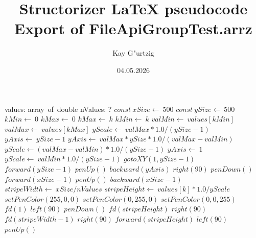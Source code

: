 \documentclass[a4paper,10pt]{article}
\title{Structorizer LaTeX pseudocode Export of FileApiGroupTest.arrz}
\author{Kay G"urtzig}
\date{04.05.2026}
\begin{document}
\begin{algorithm}
\caption{drawBarChart(2)}
\begin{algorithmic}[5]
\State {}
\State {}
\State {}
\State {}
    \State values: array\ of\ double
    \State nValues: ?
  \EndDecl
  \State \(const\ xSize\gets\ 500\)
  \State \(const\ ySize\gets\ 500\)
  \State \(kMin\gets\ 0\)
  \State \(kMax\gets\ 0\)
      \State \(kMax\gets\ k\)
    \Else
        \State \(kMin\gets\ k\)
      \EndIf
    \EndIf
  \EndFor
  \State \(valMin\gets\ values[kMin]\)
  \State \(valMax\gets\ values[kMax]\)
  \State \(yScale\gets\ valMax*1.0/(ySize-1)\)
  \State \(yAxis\gets\ ySize-1\)
      \State \(yAxis\gets\ valMax*ySize*1.0/(valMax-valMin)\)
      \State \(yScale\gets(valMax-valMin)*1.0/(ySize-1)\)
    \Else
      \State \(yAxis\gets\ 1\)
      \State \(yScale\gets\ valMin*1.0/(ySize-1)\)
    \EndIf
  \EndIf
  \State \(gotoXY(1,ySize-1)\)
  \State \(forward(ySize-1)\)
  \State \(penUp()\)
  \State \(backward(yAxis)\)
  \State \(right(90)\)
  \State \(penDown()\)
  \State \(forward(xSize-1)\)
  \State \(penUp()\)
  \State \(backward(xSize-1)\)
  \State \(stripeWidth\gets\ xSize/nValues\)
    \State \(stripeHeight\gets\ values[k]*1.0/yScale\)
        \State \(setPenColor(255,0,0)\)
      \EndSelector
        \State \(setPenColor(0,255,0)\)
      \EndSelector
        \State \(setPenColor(0,0,255)\)
      \EndSelector
    \EndCase
    \State \(fd(1)\)
    \State \(left(90)\)
    \State \(penDown()\)
    \State \(fd(stripeHeight)\)
    \State \(right(90)\)
    \State \(fd(stripeWidth-1)\)
    \State \(right(90)\)
    \State \(forward(stripeHeight)\)
    \State \(left(90)\)
    \State \(penUp()\)
  \EndFor
\EndProcedure
\end{algorithmic}
\end{algorithm}
\end{document}

